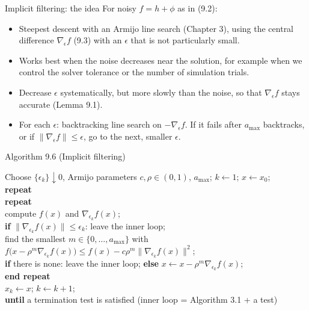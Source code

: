 \documentclass[12pt,aspectratio=169]{beamer}
\newcommand{\eps}{\epsilon}
\newcommand{\algblock}[1]{\begin{block}{}#1\end{block}}
\newcommand{\kw}[1]{\textbf{#1}}
\newcommand{\ind}{\hspace*{1.2em}}
\begin{document}
\begin{frame}{Implicit filtering: the idea}
  For noisy $f=h+\phi$ as in (9.2):
  \begin{itemize}
    \item Steepest descent with an Armijo line search (Chapter 3), using the central difference $\nabla_\eps f$ (9.3)
      with an $\eps$ that is \alert{not} particularly small.
    \item Works best when the noise decreases near the solution, for example when we control
      the solver tolerance or the number of simulation trials.
    \item Decrease $\eps$ systematically, but more slowly than the noise, so that $\nabla_\eps f$ stays accurate (Lemma 9.1).
    \item For each $\eps$: backtracking line search on $-\nabla_\eps f$.
      If it fails after $a_{\max}$ backtracks, or if $\|\nabla_\eps f\|\le\eps$, go to the next, smaller $\eps$.
  \end{itemize}
\end{frame}

\begin{frame}{Algorithm 9.6 (Implicit filtering)}
  \algblock{
    Choose $\{\eps_k\}\downarrow0$, Armijo parameters $c,\rho\in(0,1)$, $a_{\max}$; $k\leftarrow1$; $x\leftarrow x_0$;\\
    \kw{repeat}\\
    \ind \kw{repeat}\\
    \ind\ind compute $f(x)$ and $\nabla_{\eps_k}f(x)$;\\
    \ind\ind \kw{if} $\|\nabla_{\eps_k}f(x)\|\le\eps_k$: leave the inner loop;\\
    \ind\ind find the smallest $m\in\{0,\dots,a_{\max}\}$ with\\
    \ind\ind\ind $f\bigl(x-\rho^m\nabla_{\eps_k}f(x)\bigr)\le f(x)-c\rho^m\|\nabla_{\eps_k}f(x)\|^2$;\\
    \ind\ind \kw{if} there is none: leave the inner loop; \kw{else} $x\leftarrow x-\rho^m\nabla_{\eps_k}f(x)$;\\
    \ind \kw{end repeat}\\
    \ind $x_k\leftarrow x$; $k\leftarrow k+1$;\\
    \kw{until} a termination test is satisfied \hfill (inner loop = Algorithm 3.1 + a test)
  }
\end{frame}
\end{document}
